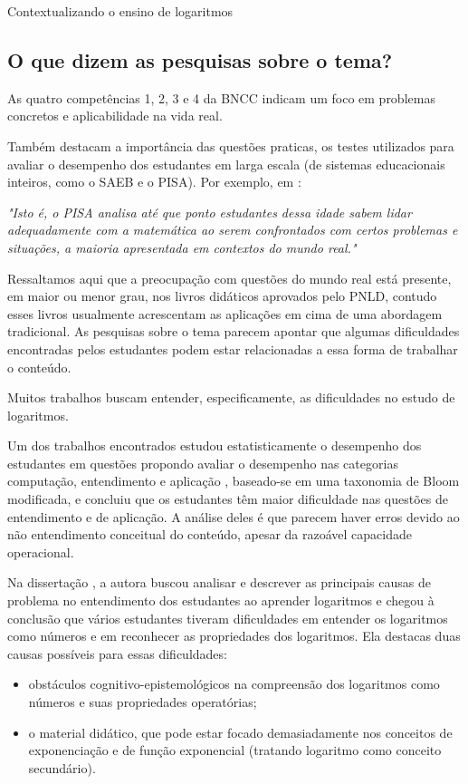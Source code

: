 \begin{apresentacao}{Contextualizando o ensino de logaritmos}
\subsection*{O que dizem as pesquisas sobre o tema?}

As quatro competências 1, 2, 3 e 4 da BNCC \citep{BNCC2018}  indicam um foco em problemas concretos e aplicabilidade na vida real. 

Também destacam a importância das questões praticas, os testes utilizados para avaliar o desempenho dos estudantes em larga escala (de sistemas educacionais inteiros, como o SAEB e o PISA). Por exemplo, em \cite[p.139]{OCDE2016}:

\textit{"Isto é, o PISA analisa até que ponto estudantes dessa idade sabem lidar adequadamente com a matemática ao serem confrontados com certos problemas e situações, a maioria apresentada em contextos do mundo real."}


Ressaltamos aqui que a preocupação com questões do mundo real está presente, em maior ou menor grau, nos livros didáticos aprovados pelo PNLD, contudo esses livros usualmente acrescentam as aplicações em cima de uma abordagem tradicional. As pesquisas sobre o tema parecem apontar que algumas dificuldades encontradas pelos estudantes podem estar relacionadas a essa forma de trabalhar o conteúdo.



	Muitos trabalhos buscam entender, especificamente, as dificuldades no estudo de logaritmos.
	 
	Um dos trabalhos encontrados \cite{Liang2005} estudou estatisticamente o desempenho dos estudantes em questões propondo avaliar o desempenho nas categorias computação, entendimento e aplicação , baseado-se em uma taxonomia de Bloom modificada, e concluiu que os estudantes têm maior dificuldade nas questões de entendimento e de aplicação. A análise deles é que parecem haver erros devido ao não entendimento conceitual do conteúdo, apesar da razoável capacidade operacional.

Na dissertação \cite{Berezovski2004}, a autora buscou analisar e descrever as principais causas de problema no entendimento dos estudantes ao aprender logaritmos e chegou à conclusão que vários estudantes tiveram dificuldades em entender os logaritmos como números e em reconhecer as propriedades dos logaritmos. Ela destacas duas causas possíveis para essas dificuldades:
	\begin{itemize}
	\item obstáculos cognitivo-epistemológicos na compreensão dos logaritmos como números e suas propriedades operatórias;
	\item o material didático, que pode estar focado demasiadamente nos conceitos de exponenciação e de função exponencial (tratando logaritmo como conceito secundário).
	\end{itemize}


\end{apresentacao}
